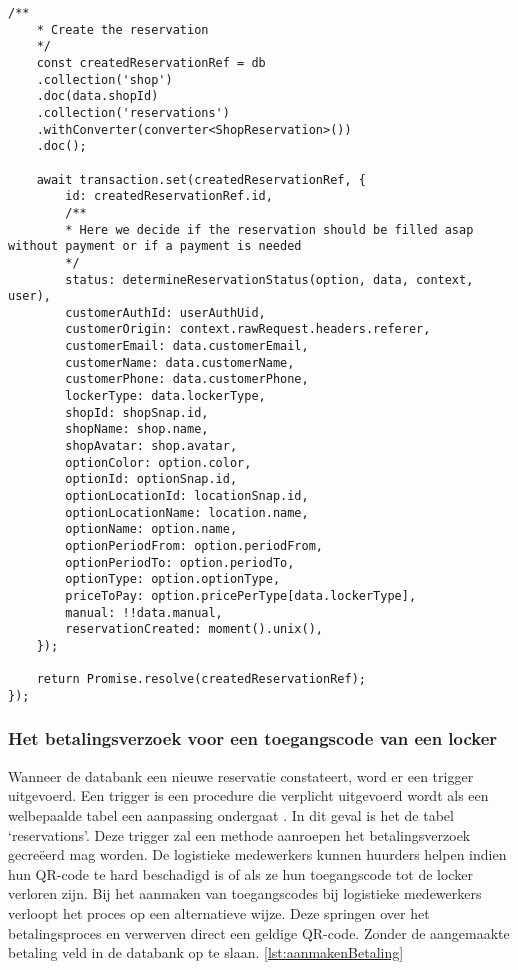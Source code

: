 \begin{lstlisting}[caption={De creatie van een reservatie voor het huren van een locker. Deze reservatie wordt bijgehouden in de databank}, label={lst:aanmakenReservatie}]
    /**
    * Create the reservation
    */
    const createdReservationRef = db
    .collection('shop')
    .doc(data.shopId)
    .collection('reservations')
    .withConverter(converter<ShopReservation>())
    .doc();
    
    await transaction.set(createdReservationRef, {
        id: createdReservationRef.id,
        /**
        * Here we decide if the reservation should be filled asap without payment or if a payment is needed
        */
        status: determineReservationStatus(option, data, context, user),
        customerAuthId: userAuthUid,
        customerOrigin: context.rawRequest.headers.referer,
        customerEmail: data.customerEmail,
        customerName: data.customerName,
        customerPhone: data.customerPhone,
        lockerType: data.lockerType,
        shopId: shopSnap.id,
        shopName: shop.name,
        shopAvatar: shop.avatar,
        optionColor: option.color,
        optionId: optionSnap.id,
        optionLocationId: locationSnap.id,
        optionLocationName: location.name,
        optionName: option.name,
        optionPeriodFrom: option.periodFrom,
        optionPeriodTo: option.periodTo,
        optionType: option.optionType,
        priceToPay: option.pricePerType[data.lockerType],
        manual: !!data.manual,
        reservationCreated: moment().unix(),
    });
    
    return Promise.resolve(createdReservationRef);
});
\end{lstlisting}

\subsubsection{Het betalingsverzoek voor een toegangscode van een locker}%
\label{sec:opbouwQR-codeVerkoop12}

Wanneer de databank een nieuwe reservatie constateert, word er een trigger uitgevoerd. Een trigger is een procedure die verplicht uitgevoerd wordt als een welbepaalde tabel een aanpassing ondergaat \autocite{documentation}. In dit geval is het de tabel ‘reservations’. Deze trigger zal een methode aanroepen het betalingsverzoek gecreëerd mag worden. 
De logistieke medewerkers kunnen huurders helpen indien hun QR-code te hard beschadigd is of als ze hun toegangscode tot de locker verloren zijn. Bij het aanmaken van toegangscodes bij logistieke medewerkers verloopt het proces op een alternatieve wijze.  Deze springen over het betalingsproces en verwerven direct een geldige QR-code. Zonder de aangemaakte betaling veld in de databank op te slaan.  \ref{lst:aanmakenBetaling}


